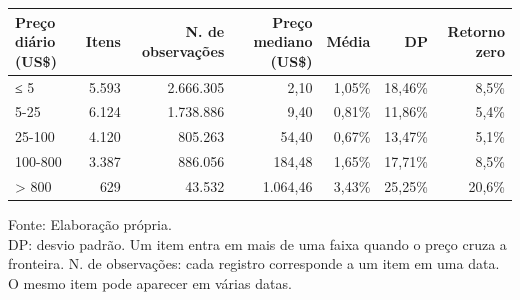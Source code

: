 \begingroup
\setlength{}
\setlength{}
\fontsize{8.0pt}{9.6pt}\selectfont

\setlength{\LTpost}{0mm}
\begin{longtable}{@{\extracolsep{\fill}}lrrrrrr}

\toprule
\textbf{Preço diário (US\$)} & \textbf{Itens} & \textbf{N. de observações} & \textbf{Preço mediano (US\$)} & \textbf{Média} & \textbf{DP} & \textbf{Retorno zero} \\ 
\midrule\addlinespace[2.5pt]
≤ 5 & 5.593 & 2.666.305 & 2,10 & 1,05\% & 18,46\% & 8,5\% \\
5-25 & 6.124 & 1.738.886 & 9,40 & 0,81\% & 11,86\% & 5,4\% \\
25-100 & 4.120 & 805.263 & 54,40 & 0,67\% & 13,47\% & 5,1\% \\
100-800 & 3.387 & 886.056 & 184,48 & 1,65\% & 17,71\% & 8,5\% \\
\textgreater{} 800 & 629 & 43.532 & 1.064,46 & 3,43\% & 25,25\% & 20,6\% \\
\bottomrule
\end{longtable}
\begin{minipage}{\linewidth}
Fonte: Elaboração própria.\\
DP: desvio padrão. Um item entra em mais de uma faixa quando o preço cruza a fronteira. N. de observações: cada registro corresponde a um item em uma data. O mesmo item pode aparecer em várias datas.\\
\end{minipage}
\endgroup
